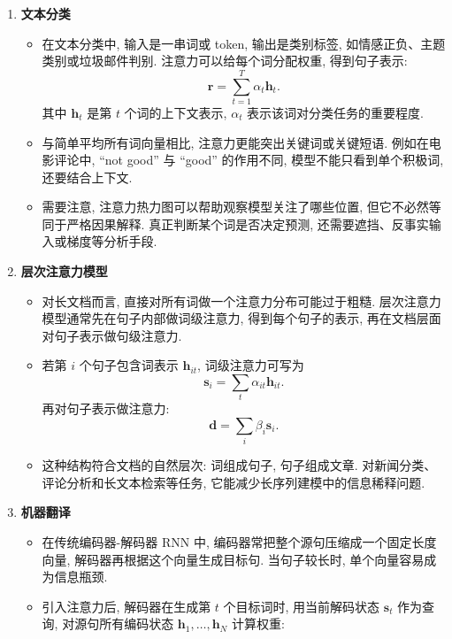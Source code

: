 \documentclass{../nndlcourse}
\begin{document}
\begin{enumerate}
  \item \textbf{文本分类}
    \begin{itemize}
      \item 在文本分类中, 输入是一串词或 token, 输出是类别标签, 如情感正负、主题类别或垃圾邮件判别. 注意力可以给每个词分配权重, 得到句子表示:
      \begin{equation*}
        \boldsymbol{r} = \sum_{t=1}^{T}\alpha_t \boldsymbol{h}_t.
      \end{equation*}
      其中 $\boldsymbol{h}_t$ 是第 $t$ 个词的上下文表示, $\alpha_t$ 表示该词对分类任务的重要程度.
      \item 与简单平均所有词向量相比, 注意力更能突出关键词或关键短语. 例如在电影评论中, ``not good'' 与 ``good'' 的作用不同, 模型不能只看到单个积极词, 还要结合上下文.
      \item 需要注意, 注意力热力图可以帮助观察模型关注了哪些位置, 但它不必然等同于严格因果解释. 真正判断某个词是否决定预测, 还需要遮挡、反事实输入或梯度等分析手段.
    \end{itemize}
  \item \textbf{层次注意力模型}
    \begin{itemize}
      \item 对长文档而言, 直接对所有词做一个注意力分布可能过于粗糙. 层次注意力模型通常先在句子内部做词级注意力, 得到每个句子的表示, 再在文档层面对句子表示做句级注意力.
      \item 若第 $i$ 个句子包含词表示 $\boldsymbol{h}_{it}$, 词级注意力可写为
      \begin{equation*}
        \boldsymbol{s}_i = \sum_t \alpha_{it}\boldsymbol{h}_{it}.
      \end{equation*}
      再对句子表示做注意力:
      \begin{equation*}
        \boldsymbol{d} = \sum_i \beta_i \boldsymbol{s}_i.
      \end{equation*}
      \item 这种结构符合文档的自然层次: 词组成句子, 句子组成文章. 对新闻分类、评论分析和长文本检索等任务, 它能减少长序列建模中的信息稀释问题.
    \end{itemize}
  \item \textbf{机器翻译}
    \begin{itemize}
      \item 在传统编码器-解码器 RNN 中, 编码器常把整个源句压缩成一个固定长度向量, 解码器再根据这个向量生成目标句. 当句子较长时, 单个向量容易成为信息瓶颈.
      \item 引入注意力后, 解码器在生成第 $t$ 个目标词时, 用当前解码状态 $\boldsymbol{s}_t$ 作为查询, 对源句所有编码状态 $\boldsymbol{h}_1,\ldots,\boldsymbol{h}_N$ 计算权重:

\end{itemize}
\end{enumerate}
\end{document}
